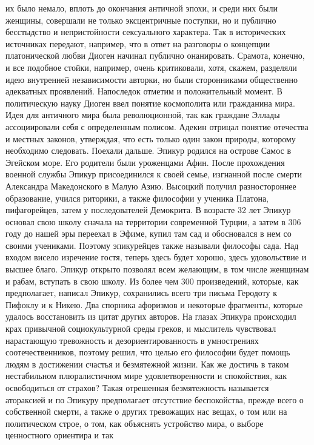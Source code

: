 их было немало, вплоть до окончания античной эпохи, и среди них были женщины,
совершали не только эксцентричные поступки, но и публично бесстыдство и
непристойности сексуального характера. Так в исторических источниках передают,
например, что в ответ на разговоры о концепции платонической любви Диоген
начинал публично онанировать. Срамота, конечно, и все подобное стойки, например,
очень критиковали, хотя, скажем, разделяли идею внутренней независимости
авторки, но были сторонниками общественно адекватных проявлений. Напоследок
отметим и положительный момент. В политическую науку Диоген ввел понятие
космополита или гражданина мира. Идея для античного мира была революционной, так
как граждане Эллады ассоциировали себя с определенным полисом. Адекин отрицал
понятие отечества и местных законов, утверждая, что есть только один закон
природы, которому необходимо следовать. Поехали дальше. Эпикур родился на
острове Самос в Эгейском море. Его родители были уроженцами Афин. После
прохождения военной службы Эпикур присоединился к своей семье, изгнанной после
смерти Александра Македонского в Малую Азию. Высоцкий получил разностороннее
образование, учился риторики, а также философии у ученика Платона, пифагорейцев,
затем у последователей Демокрита. В возрасте 32 лет Эпикур основал свою школу
сначала на территории современной Турции, а затем в 306 году до нашей эры
переехал в Эфиме, купил там сад и обосновался в нем со своими учениками. Поэтому
эпикурейцев также называли философы сада. Над входом висело изречение гостя,
теперь здесь будет хорошо, здесь удовольствие и высшее благо. Эпикур открыто
позволял всем желающим, в том числе женщинам и рабам, вступать в свою школу. Из
более чем 300 произведений, которые, как предполагает, написал Эпикур,
сохранились всего три письма Геродоту к Пифоклу и к Никею. Два спорника
афоризмов и некоторые фрагменты, которые удалось восстановить из цитат других
авторов. На глазах Эпикура происходил крах привычной социокультурной среды
греков, и мыслитель чувствовал нарастающую тревожность и дезориентированность в
умнострениях соотечественников, поэтому решил, что целью его философии будет
помощь людям в достижении счастья и безмятежной жизни. Как же достичь в таком
нестабильном плюралистичном мире удовлетворенности и спокойствия, как
освободиться от страхов? Такая отрешенная безмятежность называется атораксией и
по Эпикуру предполагает отсутствие беспокойства, прежде всего о собственной
смерти, а также о других тревожащих нас вещах, о том или на политическом строе,
о том, как объяснять устройство мира, о выборе ценностного ориентира и так

